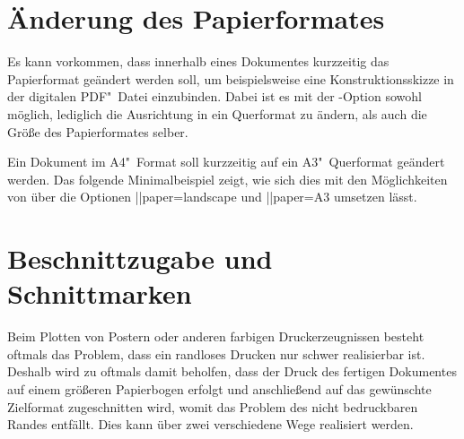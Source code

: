 \section{%
  Änderung des Papierformates%
}
%
Es kann vorkommen, dass innerhalb eines Dokumentes kurzzeitig das Papierformat 
geändert werden soll, um beispielsweise eine Konstruktionsskizze in der 
digitalen PDF"~Datei einzubinden. Dabei ist es mit der \KOMAScript-Option 
 sowohl möglich, lediglich die Ausrichtung in ein 
Querformat zu ändern, als auch die Größe des Papierformates selber.
%
\begin{Example}
Ein Dokument im A4"~Format soll kurzzeitig auf ein A3"~Querformat geändert 
werden. Das folgende Minimalbeispiel zeigt, wie sich dies mit den Möglichkeiten 
von \KOMAScript über die Optionen \Option||{paper=landscape} und 
\Option||{paper=A3} umsetzen lässt.
\end{Example}



\section{%
  Beschnittzugabe und Schnittmarken%
  \label{sec:tips:crop}%
}
%
%
Beim Plotten von Postern oder anderen farbigen Druckerzeugnissen besteht 
oftmals das Problem, dass ein randloses Drucken nur schwer realisierbar ist. 
Deshalb wird zu oftmals damit beholfen, dass der Druck des fertigen Dokumentes 
auf einem größeren Papierbogen erfolgt und anschließend auf das gewünschte 
Zielformat zugeschnitten wird, womit das Problem des nicht bedruckbaren Randes 
entfällt. Dies kann über zwei verschiedene Wege realisiert werden.

